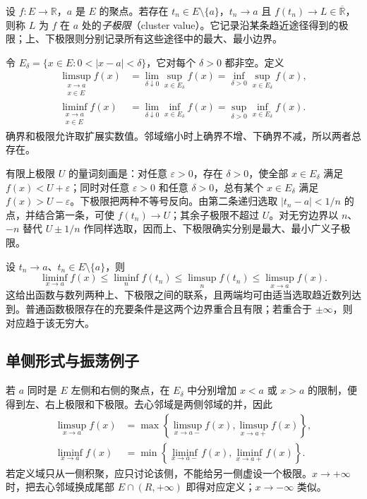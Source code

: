 设 $f:E\to\mathbb{R}$，$a$ 是 $E$ 的聚点。若存在 $t_n\in E\setminus\{a\}$，$t_n\to a$ 且 $f(t_n)\to L\in\overline{\mathbb{R}}$，则称 $L$ 为 $f$ 在 $a$ 处的\emph{子极限}（cluster value）。它记录沿某条趋近途径得到的极限；上、下极限则分别记录所有这些途径中的最大、最小边界。

\begin{definition}
\label{def:pei-function-limsup}
令 $E_\delta=\{x\in E:0<|x-a|<\delta\}$，它对每个 $\delta>0$ 都非空。定义
\begin{equation}
    \begin{aligned}
        \limsup_{\substack{x\to a\\x\in E}}f(x)
          &=\lim_{\delta\downarrow0}\sup_{x\in E_\delta}f(x)
           =\inf_{\delta>0}\sup_{x\in E_\delta}f(x),\\
        \liminf_{\substack{x\to a\\x\in E}}f(x)
          &=\lim_{\delta\downarrow0}\inf_{x\in E_\delta}f(x)
           =\sup_{\delta>0}\inf_{x\in E_\delta}f(x).
    \end{aligned}
    \label{eq:pei-function-tail-extrema}
\end{equation}
确界和极限允许取扩展实数值。邻域缩小时上确界不增、下确界不减，所以两者总存在。
\end{definition}

有限上极限 $U$ 的量词刻画是：对任意 $\varepsilon>0$，存在 $\delta>0$，使全部 $x\in E_\delta$ 满足 $f(x)<U+\varepsilon$；同时对任意 $\varepsilon>0$ 和任意 $\delta>0$，总有某个 $x\in E_\delta$ 满足 $f(x)>U-\varepsilon$。下极限把两种不等号反向。由第二条递归选取 $|t_n-a|<1/n$ 的点，并结合第一条，可使 $f(t_n)\to U$；其余子极限不超过 $U$。对无穷边界以 $n$、$-n$ 替代 $U\pm1/n$ 作同样选取，因而上、下极限确实分别是最大、最小广义子极限。

设 $t_n\to a$、$t_n\in E\setminus\{a\}$，则
\[
    \liminf_{x\to a}f(x)\le\liminf_nf(t_n)
       \le\limsup_nf(t_n)\le\limsup_{x\to a}f(x).
\]
这给出函数与数列两种上、下极限之间的联系，且两端均可由适当选取趋近数列达到。普通函数极限存在的充要条件是这两个边界重合且有限；若重合于 $\pm\infty$，则对应趋于该无穷大。

\subsection{单侧形式与振荡例子}

若 $a$ 同时是 $E$ 左侧和右侧的聚点，在 $E_\delta$ 中分别增加 $x<a$ 或 $x>a$ 的限制，便得到左、右上极限和下极限。去心邻域是两侧邻域的并，因此
\[
    \begin{aligned}
        \limsup_{x\to a}f(x)
          &=\max\left\{\limsup_{x\to a-}f(x),
                       \limsup_{x\to a+}f(x)\right\},\\
        \liminf_{x\to a}f(x)
          &=\min\left\{\liminf_{x\to a-}f(x),
                       \liminf_{x\to a+}f(x)\right\}.
    \end{aligned}
\]
若定义域只从一侧积聚，应只讨论该侧，不能给另一侧虚设一个极限。$x\to+\infty$ 时，把去心邻域换成尾部 $E\cap(R,+\infty)$ 即得对应定义；$x\to-\infty$ 类似。

